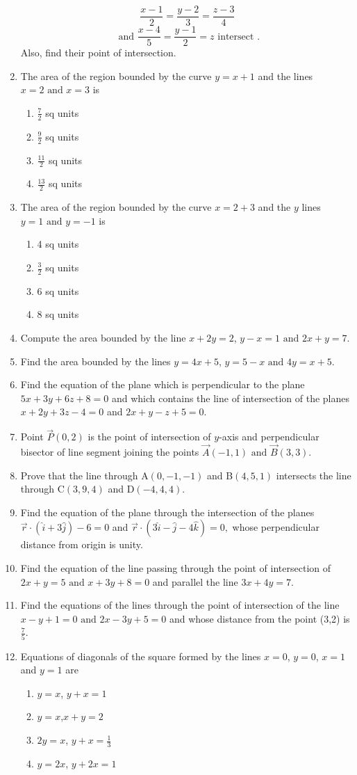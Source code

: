 \begin{enumerate}[label=\thesubsection.\arabic*,ref=\thesubsection.\theenumi]
$$\frac{x-1}{2}=\frac{y-2}{3}=\frac{z-3}{4}$$
$$\text{ and } \frac{x-4}{5}=\frac{y-1}{2}=z  \text{ intersect }.$$
 Also, find their point of intersection.
\item The area of the region bounded by the curve $y = x + 1$ and the lines $x = 2\text{ and }x = 3$ is
\begin{enumerate}
\item $\frac{7}{2}$ sq units
\item $\frac{9}{2}$ sq units
\item $\frac{11}{2}$ sq units
\item $\frac{13}{2}$ sq units
\end{enumerate}   
\item The area of the region bounded by the curve $x = 2 + 3$ and the $y$ lines $y = 1\text{ and }y = - 1$ is
\begin{enumerate}
\item 4 sq units 
\item $\frac{3}{2}$ sq units
\item 6 sq units
\item 8 sq units
\end{enumerate}
\item Compute the area bounded by the line $x + 2y = 2$, $y - x = 1\text{ and }2x + y = 7$.
\item Find the area bounded by the lines $y = 4x + 5$, $y = 5 - x\text{ and }4y = x + 5$.
\item Find the equation of the plane which is perpendicular to the plane $5x+3y+6z+8=0$ and which contains the line of intersection of the planes $x+2y+3z-4=0$ and $2x+y-z+5=0.$
\item  Point $\vec{P}(0,2)$ is the point of intersection of $y$-axis and perpendicular bisector of line segment joining the points $\vec{A}(-1,1) \text{ and } \vec{B}(3,3)$.
\item Prove that the line through A$(0,-1,-1)$ and B$(4,5,1)$ intersects the line through C$(3,9,4)$ and D$(-4,4,4)$.
\item Find the equation of the plane through the intersection of the planes $\overrightarrow{r} \cdot (\hat{i}+3\hat{j}) - 6=0$ and $\overrightarrow{r} \cdot (3\hat{i}-\hat{j}-4\hat{k})=0,$ whose perpendicular distance from origin is unity.
\item Find the equation of the line passing through the point of intersection of $2x+y=5\text{ and }x+3y+8=0$ and parallel the line $3x+4y=7$.
\item Find the equations of the lines through the point of intersection of the line $x-y+1=0 \text{ and }2x-3y+5=0$ and whose distance from the point (3,2) is $\frac{7}{5}$.
\item Equations of diagonals of the square formed by the lines $x=0$, $y=0$, $x=1$ and $y=1$ are
\begin{enumerate}
\item $y=x$, $y+x=1$
\item $y=x$,$x+y=2$
\item $2y=x$, $y+x=\frac{1}{3}$
\item $y=2x$, $y+2x=1$
\end{enumerate}
\end{enumerate}
